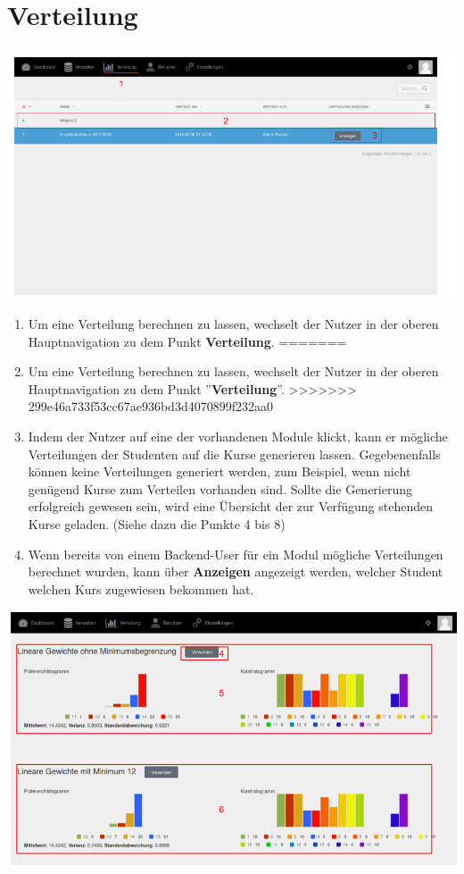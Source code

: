   
  \section{Verteilung}
  \label{section:distribution}
  
  \includegraphics[scale=0.3]{backend/img/distribution_1 .png}
  
  \begin{enumerate}
<<<<<<< HEAD
   \item Um eine Verteilung berechnen zu lassen, wechselt der Nutzer in der oberen Hauptnavigation zu dem Punkt \textbf{Verteilung}.
=======
   \item Um eine Verteilung berechnen zu lassen, wechselt der Nutzer in der oberen Hauptnavigation zu dem Punkt ''\textbf{Verteilung}''.
>>>>>>> 299e46a733f53cc67ae936bd3d4070899f232aa0
   \item Indem der Nutzer auf eine der vorhandenen Module klickt, kann er mögliche Verteilungen der Studenten auf die Kurse generieren lassen.
	 Gegebenenfalls können keine Verteilungen generiert werden, zum Beispiel, wenn nicht genügend Kurse zum Verteilen vorhanden sind.
	 Sollte die Generierung erfolgreich gewesen sein, wird eine Übersicht der zur Verfügung stehenden Kurse geladen. 
	 (Siehe dazu die Punkte 4 bis 8)
   \item Wenn bereits von einem Backend-User für ein Modul mögliche Verteilungen berechnet wurden, kann über \textbf{Anzeigen} angezeigt werden, welcher Student welchen Kurs zugewiesen bekommen hat.
  \end{enumerate}
  
  \includegraphics[scale=0.3]{backend/img/distribution_2.png}
  
